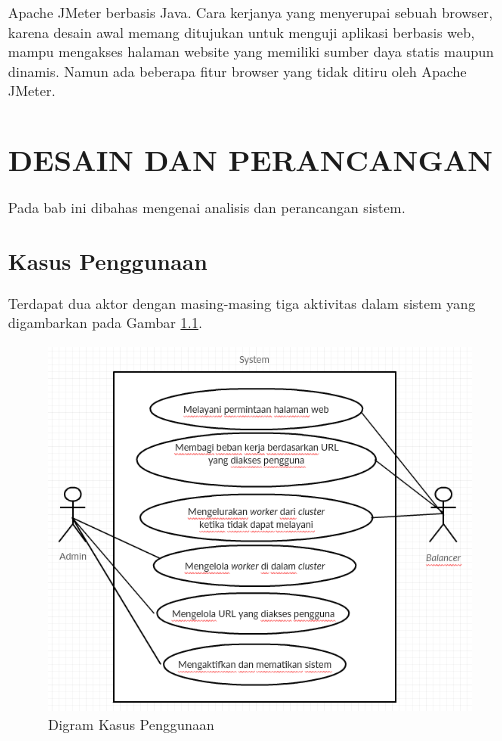 \documentclass{ta-its}
\begin{document}
			Apache JMeter berbasis Java. Cara kerjanya yang menyerupai sebuah browser, karena desain awal memang ditujukan untuk menguji aplikasi berbasis web, mampu mengakses halaman website yang memiliki sumber daya statis maupun dinamis. Namun ada beberapa fitur browser yang tidak ditiru oleh Apache JMeter.


    \chapter{DESAIN DAN PERANCANGAN}
	    Pada bab ini dibahas mengenai analisis dan perancangan sistem.
	    
	    \section{Kasus Penggunaan}
		    Terdapat dua aktor dengan masing-masing tiga aktivitas dalam sistem yang digambarkan pada Gambar \ref{gambarDiagramKasusPenggunaan}.
		    
		    \begin{figure}[h] %
		    	\centering
		    	\includegraphics[width=\linewidth]{contoh_img/usecase}
		    	\caption{Digram Kasus Penggunaan}
		    	\label{gambarDiagramKasusPenggunaan}
		    \end{figure}
		    
\end{document}
